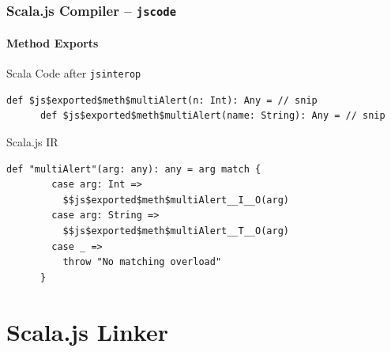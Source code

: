 \documentclass{beamer}
\begin{document}
\begin{frame}[fragile]
  \frametitle{Scala.js Compiler -- \texttt{jscode}}
  \framesubtitle{Method Exports}

  \begin{block}{Scala Code after \texttt{jsinterop}}
    \begin{lstlisting}[gobble=6]
      def $js$exported$meth$multiAlert(n: Int): Any = // snip
      def $js$exported$meth$multiAlert(name: String): Any = // snip
    \end{lstlisting}
  \end{block}

  \pause

  \begin{block}{Scala.js IR}
    \begin{lstlisting}[gobble=6]
      def "multiAlert"(arg: any): any = arg match {
        case arg: Int =>
          $$js$exported$meth$multiAlert__I__O(arg)
        case arg: String =>
          $$js$exported$meth$multiAlert__T__O(arg)
        case _ =>
          throw "No matching overload"
      }
    \end{lstlisting}
  \end{block}

\end{frame}


\section{Scala.js Linker}
\end{document}
